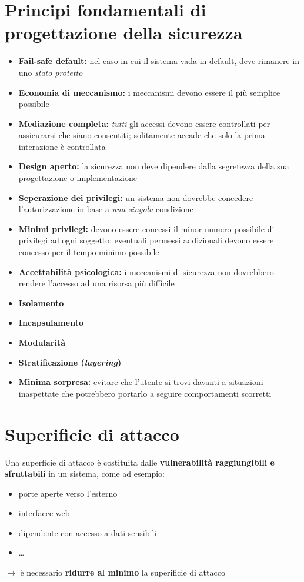 \section{Principi fondamentali di progettazione della sicurezza}
\begin{itemize}
    \item \textbf{Fail-safe default:} nel caso in cui il sistema vada in default, deve rimanere
    in uno \textit{stato protetto}
    \item \textbf{Economia di meccanismo:} i meccanismi devono essere il più semplice possibile 
    \item \textbf{Mediazione completa:} \textit{tutti} gli accessi devono essere controllati per assicurarsi 
    che siano consentiti; solitamente accade che solo la prima interazione è controllata 
    \item \textbf{Design aperto:} la sicurezza non deve dipendere dalla segretezza della sua progettazione 
    o implementazione
    \item \textbf{Seperazione dei privilegi:} un sistema non dovrebbe concedere l'autorizzazione in base 
    a \textit{una singola} condizione
    \item \textbf{Minimi privilegi:} devono essere concessi il minor numero possibile di privilegi
    ad ogni soggetto; eventuali permessi addizionali devono essere concesso per il tempo minimo possibile
    \item \textbf{Accettabilità psicologica:} i meccanismi di sicurezza non dovrebbero rendere l'accesso 
    ad una risorsa più difficile
    \item \textbf{Isolamento}
    \item \textbf{Incapsulamento}
    \item \textbf{Modularità}
    \item \textbf{Stratificazione (\textit{layering})}
    \item \textbf{Minima sorpresa:} evitare che l'utente si trovi davanti a situazioni inaspettate 
    che potrebbero portarlo a seguire comportamenti scorretti
\end{itemize}

\section{Superificie di attacco}
Una superficie di attacco è costituita dalle \textbf{vulnerabilità raggiungibili e sfruttabili} in 
un sistema, come ad esempio:
\begin{itemize}
    \item porte aperte verso l'esterno
    \item interfacce web
    \item dipendente con accesso a dati sensibili 
    \item \dots
\end{itemize}
$\rightarrow$ è necessario \textbf{ridurre al minimo} la superificie di attacco

